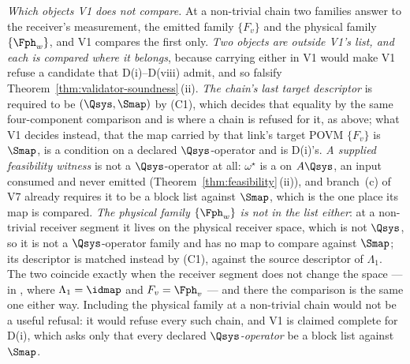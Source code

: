 \begin{remark}
\emph{Which objects V1 does not compare.} At a non-trivial chain two families
answer to the receiver's measurement, the emitted family $\{F_v\}$ and the
physical family $\{\Fph_w\}$, and V1 compares the first only. \emph{Two
objects are outside V1's list, and each is compared where it belongs},
because carrying either in V1 would make V1 refuse a candidate that
D(i)--D(viii) admit, and so falsify Theorem~\ref{thm:validator-soundness}\,(ii). \emph{The
chain's last target descriptor} is required to be $(\Qsys,\Smap)$ by (C1),
which decides that equality by the same four-component comparison and is
where a chain is refused for it, as above; what V1 decides instead, that the
map carried by that link's target POVM $\{F_v\}$ is $\Smap$, is a condition
on a declared $\Qsys$-operator and is D(i)'s. \emph{A supplied feasibility
witness} is not a $\Qsys$-operator at all: $\omega^{\star}$ is a
 on $A\Qsys$, an input consumed and never emitted
(Theorem~\ref{thm:feasibility}\,(ii)), and branch~(c) of V7 already requires it to be
a block list against $\Smap$, which is the one place its map is compared.
\emph{The physical family $\{\Fph_w\}$ is not in the list either}: at a
non-trivial receiver segment it lives on the physical receiver space, which
is not $\Qsys$, so it is not a $\Qsys$-operator family and has no map to
compare against $\Smap$; its descriptor is matched instead by (C1), against
the source descriptor of $\Lambda_1$. The two coincide exactly when the
receiver segment does not change the space --- in , where
$\Lambda_1=\idmap$ and $F_v=\Fph_v$ --- and there the comparison is the same
one either way. Including the physical family at a non-trivial chain would
not be a useful refusal: it would refuse every such chain, and V1 is claimed
complete for D(i), which asks only that every declared
\emph{$\Qsys$-operator} be a block list against $\Smap$.
\end{remark}
